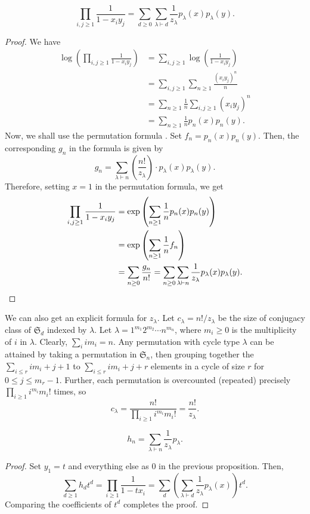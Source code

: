 	\begin{prop}
		\[ \prod_{i,j \ge 1} \frac{1}{1-x_iy_j} = \sum_{d \ge 0} \sum_{\lambda \vdash d} \frac{1}{z_\lambda} p_\lambda(x) p_\lambda(y). \]
	\end{prop}
	\begin{proof}
		We have
		\begin{align*}
			\log \left( \prod_{i,j \ge 1} \frac{1}{1-x_iy_j} \right) &= \sum_{i,j \ge 1} \log\left( \frac{1}{1-x_iy_j} \right) \\
				&= \sum_{i,j \ge 1} \sum_{n \ge 1} \frac{(x_iy_j)^n}{n} \\
				&= \sum_{n \ge 1} \frac{1}{n} \sum_{i,j \ge 1} (x_iy_j)^n \\
				&= \sum_{n \ge 1} \frac{1}{n} p_n(x)p_n(y).
		\end{align*}
		Now, we shall use the permutation formula . Set $f_n = p_n(x) p_n(y)$. Then, the corresponding $g_n$ in the formula is given by
		\[ g_n = \sum_{\lambda \vdash n} \left( \frac{n!}{z_\lambda} \right) \cdot p_\lambda(x) p_\lambda(y). \]
		Therefore, setting $x = 1$ in the permutation formula, we get
		\begin{align*}
			\prod_{i,j \ge 1} \frac{1}{1-x_iy_j} &= \exp \left( \sum_{n \ge 1} \frac{1}{n} p_n(x) p_n(y) \right) \\
				&= \exp\left( \sum_{n\ge 1} \frac{1}{n} f_n \right) \\
				&= \sum_{n \ge 0} \frac{g_n}{n!} = \sum_{n \ge 0} \sum_{\lambda \vdash n} \frac{1}{z_\lambda} p_\lambda(x) p_\lambda(y). \qedhere
		\end{align*}
	\end{proof}

	We can also get an explicit formula for $z_\lambda$. Let $c_\lambda = n!/z_\lambda$ be the size of conjugacy class of $\mathfrak{S}_d$ indexed by $\lambda$. Let $\lambda = 1^{m_1} 2^{m_2} \cdots n^{m_n}$, where $m_i \ge 0$ is the multiplicity of $i$ in $\lambda$. Clearly, $\sum_i i m_i = n$. Any permutation with cycle type $\lambda$ can be attained by taking a permutation in $\mathfrak{S}_n$, then grouping together the $\sum_{i \le r} i m_i + j + 1$ to $\sum_{i \le r} i m_i + j + r$ elements in a cycle of size $r$ for $0 \le j \le m_r-1$. Further, each permutation is overcounted (repeated) precisely $\prod_{i \ge 1} i^{m_i} m_i!$ times, so
	\[ c_\lambda = \frac{n!}{\prod_{i \ge 1} i^{m_i} m_i!} = \frac{n!}{z_\lambda}. \]

	\begin{corollary}
		\[ h_n = \sum_{\lambda \vdash n} \frac{1}{z_\lambda} p_\lambda. \]
	\end{corollary}
	\begin{proof}
		Set $y_1 = t$ and everything else as $0$ in the previous proposition. Then,
		\[ \sum_{d \ge 1} h_d t^d = \prod_{i \ge 1} \frac{1}{1-tx_i} = \sum_d \left(\sum_{\lambda \vdash d} \frac{1}{z_\lambda} p_\lambda(x)\right) t^d. \]
		Comparing the coefficients of $t^d$ completes the proof.
	\end{proof}

